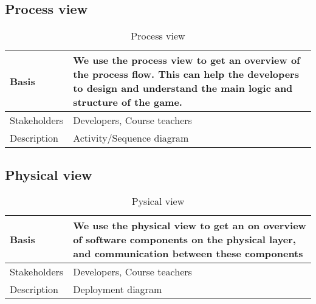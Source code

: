 \vspace{-20pt}

\subsection{Process view}

\begin{table}[h!]
\begin{tabular}{ | p{90pt} | p{270pt}  |}
\hline
Basis	 & We use the process view to get an overview of the process flow. This can help the developers to design and understand the main logic and structure of the game. \\ \hline
Stakeholders & Developers, Course teachers\\ \hline 
Description & Activity/Sequence diagram \\ \hline


\end{tabular}

\caption{Process view}

\end{table}

\vspace{-20pt}

\subsection{Physical view}

\begin{table}[h!]
\begin{tabular}{ | p{90pt} | p{270pt}  |}
\hline
Basis	 & We use the physical view to get an on overview of software components on the physical layer, and communication between these components  \\ \hline
Stakeholders & Developers, Course teachers\\ \hline 
Description & Deployment diagram \\ \hline


\end{tabular}

\caption{Pysical view}

\end{table}

\vspace{-20pt}








